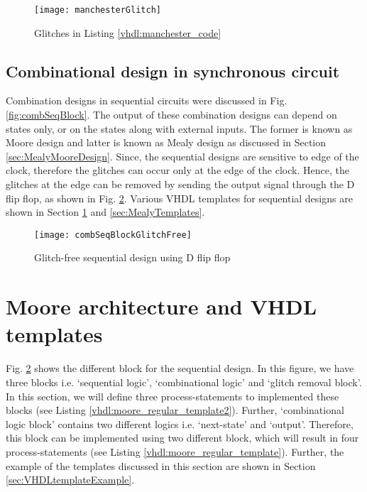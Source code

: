 \begin{figure}[!h]
	\centering
	\texttt{[image: manchesterGlitch]}
	\caption{Glitches in Listing \ref{vhdl:manchester_code}}
	\label{fig:manchesterGlitch}
\end{figure}





\subsection{Combinational design in synchronous circuit}\label{sec:glitchInsSync}
Combination designs in sequential circuits were discussed in Fig. \ref{fig:combSeqBlock}. The output of these combination designs can depend on states only, or on the states along with external inputs. The former is known as Moore design and latter is known as Mealy design as discussed in Section \ref{sec:MealyMooreDesign}. Since, the sequential designs are sensitive to edge of the clock, therefore the glitches can occur only at the edge of the clock. Hence, the glitches at the edge can be removed by sending the output signal through the D flip flop, as shown in Fig. \ref{fig:combSeqBlockGlitchFree}. Various VHDL templates for sequential designs are shown in Section \ref{sec:MooreTemplates} and \ref{sec:MealyTemplates}. 

\begin{figure}[!h]
	\centering
	\texttt{[image: combSeqBlockGlitchFree]}
	\caption{Glitch-free sequential design using D flip flop}
	\label{fig:combSeqBlockGlitchFree}
\end{figure}


\section{Moore architecture and VHDL templates} \label{sec:MooreTemplates}
Fig. \ref{fig:combSeqBlockGlitchFree} shows the different block for the sequential design. In this figure, we have three blocks i.e. `sequential logic', `combinational logic' and `glitch removal block'. In this section, we will define three process-statements to implemented these blocks (see Listing \ref{vhdl:moore_regular_template2}). Further, `combinational logic block' contains two different logics i.e. `next-state' and `output'. Therefore, this block can be implemented using two different block, which will result in four process-statements (see Listing \ref{vhdl:moore_regular_template}). Further, the example of the templates discussed in this section are shown in Section \ref{sec:VHDLtemplateExample}.

